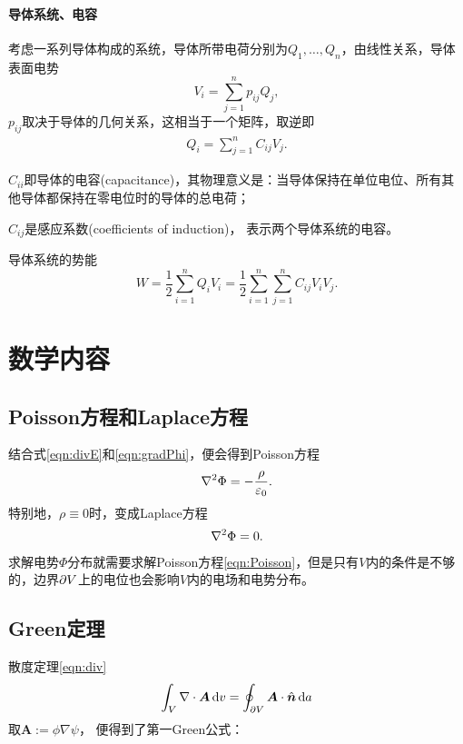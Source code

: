 \paragraph{导体系统、电容}
考虑一系列导体构成的系统，导体所带电荷分别为$Q_1,\ldots,Q_n$，由线性关系，导体表面电势
\[
    V_i=\sum_{j=1}^np_{ij}Q_j,
\]
$p_{ij}$取决于导体的几何关系，这相当于一个矩阵，取逆即
\begin{align}
    Q_i=\sum_{j=1}^nC_{ij}V_j.
\end{align}
\begin{compactitem}
	\item $C_{ii}$即导体的电容(capacitance)，其物理意义是：当导体保持在单位电位、所有其他导体都保持在零电位时的导体的总电荷；
	\item $C_{ij}$是感应系数(coefficients of induction)，%
    表示两个导体系统的电容。
\end{compactitem}
导体系统的势能
\[
    W=\frac12\sum_{i=1}^nQ_iV_i=\frac12\sum_{i=1}^n\sum_{j=1}^nC_{ij}V_iV_j.
\]

\section{数学内容}

\subsection{Poisson方程和Laplace方程}

结合式\eqref{eqn:divE}和\eqref{eqn:gradPhi}，便会得到Poisson方程
\begin{align}
    \label{eqn:Poisson}
    \nabla^2\Phi=-\frac\rho{\varepsilon_0}.
\end{align}
特别地，$\rho\equiv 0$时，变成Laplace方程
\begin{align}
    \label{eqn:Laplace}
    \nabla^2\Phi=0.
\end{align}
求解电势$\Phi$分布就需要求解Poisson方程\eqref{eqn:Poisson}，但是只有$V$内的条件是不够的，边界$\partial V$上的电位也会影响$V$内的电场和电势分布。

\subsection{Green定理}

散度定理\eqref{eqn:div}
\[
    \int_V\nabla\cdot\bm A\mathop{}\!\mathrm{d} v=\oint_{\partial V}\bm A\cdot\mathop{}\!\hat{\bm{n}}\mathop{}\!\mathrm{d} a
\]
取$\bm A:=\phi\nabla\psi$，
便得到了第一Green公式：

